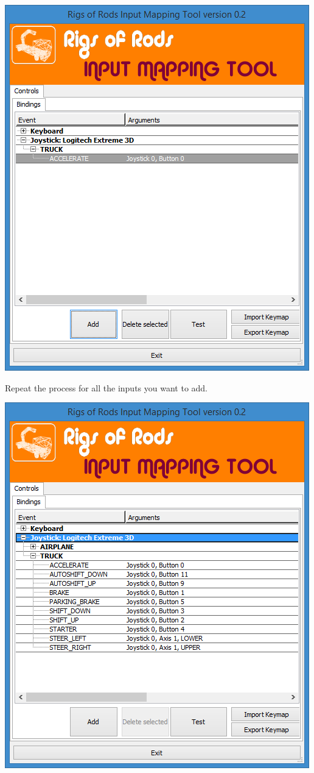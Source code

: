 \includegraphics{images/InputMappingTool-3.png}

Repeat the process for all the inputs you want to add.

\includegraphics{images/InputMappingTool-4.png}

